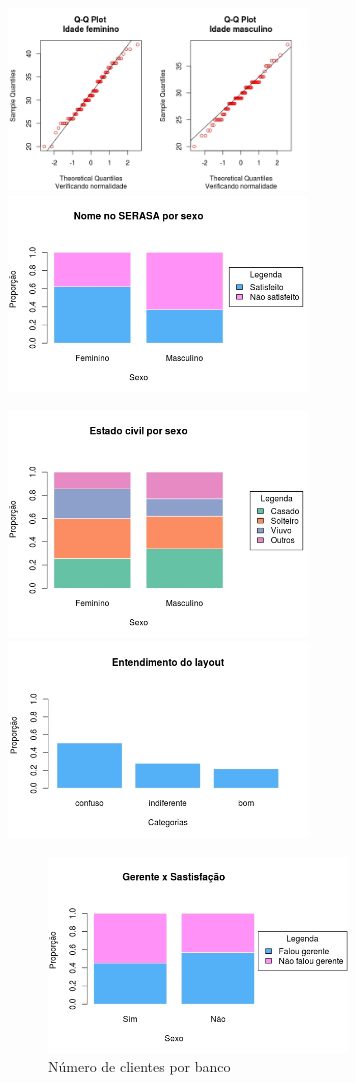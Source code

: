 \documentclass[]{article}
\begin{document}
\includegraphics[width=3.12500in]{QQ Plot idade genero.jpeg}
\includegraphics[width=3.12500in]{Nome no SERASA por sexo.jpeg}

\includegraphics[width=3.12500in]{Estado civil por Sexo.jpeg}
\includegraphics[width=3.12500in]{Entedimento do Layout.jpeg}

\begin{figure}
\centering
\includegraphics[width=3.12500in]{Gerente Satisfacao.jpeg}
\caption{Número de clientes por banco}
\end{figure}
\end{document}
